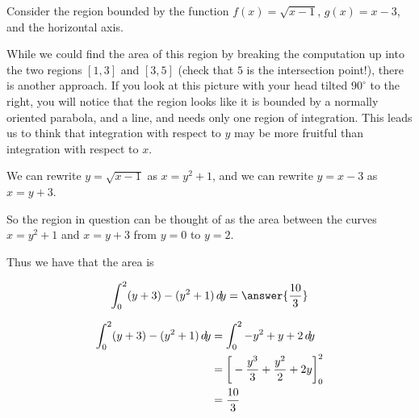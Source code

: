 \documentclass{ximera}
\begin{document}
\begin{example}
	Consider the region bounded by the function $f(x) = \sqrt{x-1}$, $g(x) = x-3$, and the horizontal axis.
\begin{image}

\end{image}

While we could find the area of this region by breaking the computation up into the two regions $[1,3]$ and $[3,5]$ (check that $5$ is the intersection point!), there is another approach.  If you look at this picture with your head tilted $90^\circ$ to the right, you will notice that the region looks like it is bounded by a normally oriented parabola, and a line, and needs only one region of integration.  This leads us to think that integration with respect to $y$ may be more fruitful than integration with respect to $x$.

We can rewrite $y = \sqrt{x-1}$ as $x = y^2+1$, and we can rewrite $y = x-3$ as $x = y+3$.  

So the region in question can be thought of as the area between the curves $ x = y^2+1$ and $x=y+3$ from $y=0$ to $y=2$.

Thus we have that the area is 

\[
\int_0^2 (y+3) - (y^2+1) \d y = \answer{\frac{10}{3}}
\]

\begin{hint}
\begin{align*}
	\int_0^2 (y+3) - (y^2+1) \mathop{}\!d\! y &= \int_0^2 -y^2+y+2 \mathop{}\!d\! y\\
	&=\bigg[ -\frac{y^3}{3} + \frac{y^2}{2}+2y \bigg]_0^2\\
	&=\frac{10}{3}
\end{align*}
\end{hint}

	
\end{example}
\end{document}
